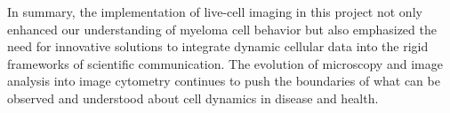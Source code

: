 























In summary, the implementation of live-cell imaging in this project not only
enhanced our understanding of myeloma cell behavior but also emphasized the need
for innovative solutions to integrate dynamic cellular data into the rigid
frameworks of scientific communication. The evolution of microscopy and image
analysis into image cytometry continues to push the boundaries of what can be
observed and understood about cell dynamics in disease and health.


